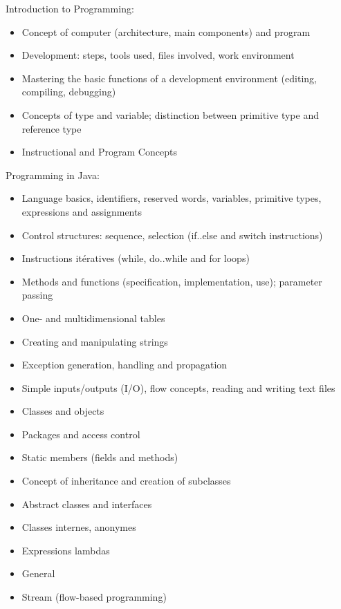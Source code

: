 Introduction to Programming:
\begin{itemize}
    \item Concept of computer (architecture, main components) and program
    \item Development: steps, tools used, files involved, work environment
    \item Mastering the basic functions of a development environment (editing, compiling, debugging)
    \item Concepts of type and variable; distinction between primitive type and reference type
    \item Instructional and Program Concepts
\end{itemize}
Programming in Java:
\begin{itemize}
    \item Language basics, identifiers, reserved words, variables, primitive types, expressions and assignments
    \item Control structures: sequence, selection (if..else and switch instructions)
    \item Instructions itératives (while, do..while and for loops)
    \item Methods and functions (specification, implementation, use); parameter passing
    \item One- and multidimensional tables
    \item Creating and manipulating strings
    \item Exception generation, handling and propagation
    \item Simple inputs/outputs (I/O), flow concepts, reading and writing text files
    \item Classes and objects
    \item Packages and access control
    \item Static members (fields and methods)
    \item Concept of inheritance and creation of subclasses
    \item Abstract classes and interfaces
    \item Classes internes, anonymes
    \item Expressions lambdas
    \item General
    \item Stream (flow-based programming)
\end{itemize}